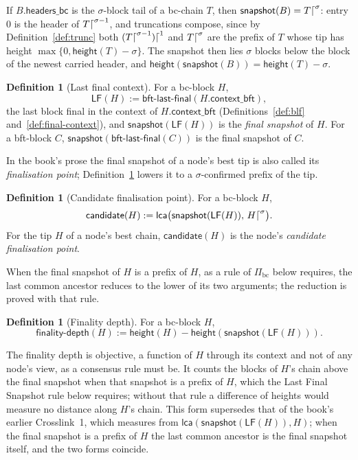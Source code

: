 \documentclass[11pt,a4paper]{article}
\theoremstyle{definition}
\newtheorem{definition}[theorem]{Definition}
\newcommand{\bc}{\mathrm{bc}}
\newcommand{\lca}{\mathsf{lca}}
\newcommand{\Pibc}{\Pi_{\bc}}
\newcommand{\bftlastfinal}{\mathsf{bft\text{-}last\text{-}final}}
\newcommand{\contextbft}{\mathsf{context\_bft}}
\newcommand{\headersbc}{\mathsf{headers\_bc}}
\newcommand{\snapshot}{\mathsf{snapshot}}
\newcommand{\LF}{\mathsf{LF}}
\newcommand{\candidate}{\mathsf{candidate}}
\newcommand{\finalitydepth}{\mathsf{finality\text{-}depth}}
\begin{document}
If $B.\headersbc$ is the $\sigma$-block tail of a bc-chain $T$, then
$\snapshot(B) = T\trunc{\sigma}$: entry $0$ is the header of
$T\trunc{\sigma - 1}$, and truncations compose, since by
Definition~\ref{def:trunc} both $(T\trunc{\sigma-1})\trunc{1}$ and
$T\trunc{\sigma}$ are the prefix of $T$ whose tip has height
$\max\{0, \mathsf{height}(T) - \sigma\}$.
The snapshot then lies $\sigma$ blocks below the block of the newest carried
header, and $\mathsf{height}(\snapshot(B)) = \mathsf{height}(T) - \sigma$.

\begin{definition}[Last final context]\label{def:lf}
For a bc-block $H$,
\[
  \LF(H) := \bftlastfinal(H.\contextbft),
\]
the last block final in the context of $H.\contextbft$
(Definitions~\ref{def:blf} and~\ref{def:final-context}), and
$\snapshot(\LF(H))$ is the \emph{final snapshot} of $H$. For a bft-block $C$,
$\snapshot(\bftlastfinal(C))$ is the final snapshot of $C$.
\end{definition}

In the book's prose the final snapshot of a node's best tip is also called
its \emph{finalisation point}; Definition~\ref{def:candidate} lowers it to a
$\sigma$-confirmed prefix of the tip.

\begin{definition}[Candidate finalisation point]\label{def:candidate}
For a bc-block $H$,
\[
  \candidate(H) := \lca\bigl(\snapshot(\LF(H)),\, H\trunc{\sigma}\bigr).
\]
For the tip $H$ of a node's best chain, $\candidate(H)$ is the node's
\emph{candidate finalisation point}.
\end{definition}

When the final snapshot of $H$ is a prefix of $H$, as a rule of $\Pibc$ below
requires, the last common ancestor reduces to the lower of its two arguments;
the reduction is proved with that rule.

\begin{definition}[Finality depth]\label{def:fdepth}
For a bc-block $H$,
\[
  \finalitydepth(H) := \mathsf{height}(H) - \mathsf{height}(\snapshot(\LF(H))).
\]
\end{definition}

The finality depth is objective, a function of $H$ through its context and
not of any node's view, as a consensus rule must be. It counts the blocks of
$H$'s chain above the final snapshot when that snapshot is a prefix of $H$,
which the Last Final Snapshot rule below requires; without that rule a
difference of heights would measure no distance along $H$'s chain. This
form supersedes that of the book's earlier Crosslink~1, which measures from
$\lca(\snapshot(\LF(H)), H)$; when the final snapshot is a prefix of $H$ the
last common ancestor is the final snapshot itself, and the two forms
coincide.
\end{document}
